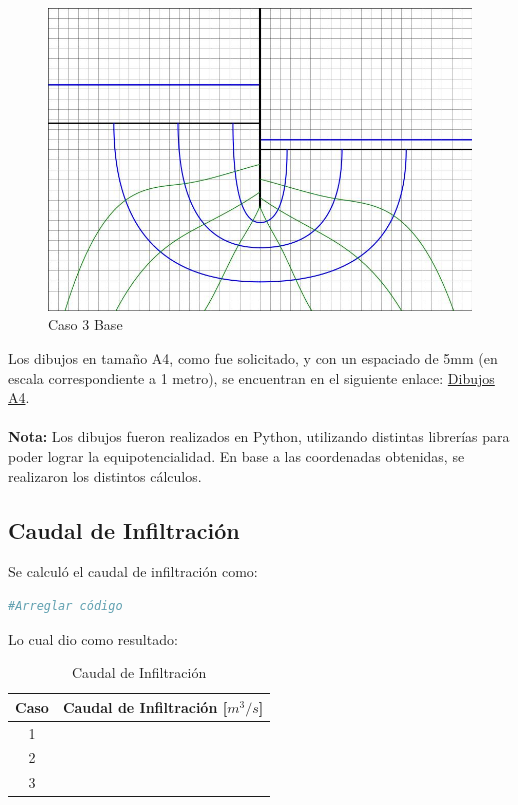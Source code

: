 \begin{figure}[H]
\begin{minipage}{0.32\textwidth}
      \includegraphics[width=\textwidth]{FOTOS/caso_3dibujo_base.jpg}
      \caption{Caso 3 Base}
  \end{minipage}
\end{figure}

Los dibujos en tamaño A4, como fue solicitado, y con un espaciado de 5mm (en escala correspondiente a 1 metro), se encuentran en el siguiente enlace: \href{https://github.com/LukasWolff2002/PROYECTO_1_MCOC/tree/main/DIBUJOS_A4}{Dibujos A4}.
\\ \\
\textbf{Nota:} Los dibujos fueron realizados en Python, utilizando distintas librerías para poder lograr la equipotencialidad. En base a las coordenadas obtenidas, se realizaron los distintos cálculos.

\subsection{Caudal de Infiltración}

Se calculó el caudal de infiltración como:

\begin{lstlisting}[language=Python]
  #Arreglar código
\end{lstlisting}

Lo cual dio como resultado:

\begin{table}[H]
  \centering
  \begin{tabular}{|c|c|}
    \hline
    Caso & Caudal de Infiltración [$m^3/s$] \\
    \hline
    1 &  \\ \hline
    2 &  \\ \hline
    3 &  \\
    \hline
  \end{tabular}
  \caption{Caudal de Infiltración}
\end{table}

